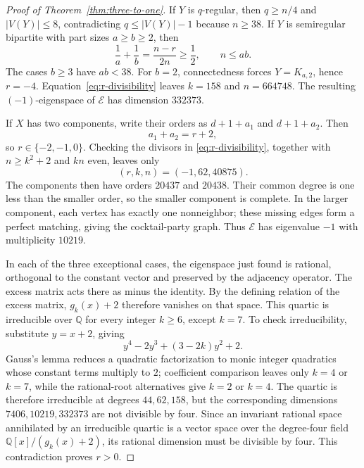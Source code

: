 \documentclass[a4paper,10pt,reqno]{amsart}
\theoremstyle{plain}
\theoremstyle{definition}
\theoremstyle{remark}
\begin{document}
\begin{proof}[Proof of Theorem~\ref{thm:three-to-one}]
If \(Y\) is \(q\)-regular, then \(q\ge n/4\) and
\(|V(Y)|\le8\), contradicting \(q\le |V(Y)|-1\) because \(n\ge38\).
If \(Y\) is semiregular bipartite with part sizes \(a\ge b\ge2\), then
\[
 \frac1a+\frac1b=\frac{n-r}{2n}\ge\frac12,\qquad n\le ab.
\]
The cases \(b\ge3\) have \(ab<38\).  For \(b=2\), connectedness forces
\(Y=K_{a,2}\), hence \(r=-4\).  Equation~\eqref{eq:r-divisibility} leaves
\(k=158\) and \(n=664748\).  The resulting \((-1)\)-eigenspace of \(\mathcal E\)
 has dimension \(332373\).

If \(X\) has two components, write their orders as
\(d+1+a_1\) and \(d+1+a_2\).  Then
\[
 a_1+a_2=r+2,
\]
so \(r\in\{-2,-1,0\}\).  Checking the divisors in
\eqref{eq:r-divisibility}, together with \(n\ge k^2+2\) and \(kn\) even,
leaves only
\[
 (r,k,n)=(-1,62,40875).
\]
The components then have orders \(20437\) and \(20438\).  Their common
degree is one less than the smaller order, so the smaller component is
complete.  In the larger component, each vertex has exactly one
nonneighbor; these missing edges form a perfect matching, giving the
cocktail-party graph.  Thus \(\mathcal E\) has eigenvalue \(-1\) with
 multiplicity \(10219\).

In each of the three exceptional cases, the eigenspace just found is
rational, orthogonal to the constant vector and preserved by the adjacency
operator. The excess matrix acts there as minus the identity. By the
defining relation of the excess matrix, \(g_k(x)+2\) therefore vanishes on
that space.  This quartic is irreducible over
\(\mathbb Q\) for every integer \(k\ge6\), except \(k=7\).  To check
irreducibility, substitute \(y=x+2\), giving
 \[
  y^4-2y^3+(3-2k)y^2+2.
 \]
 Gauss's lemma reduces a quadratic factorization to monic integer quadratics
 whose constant terms multiply to \(2\); coefficient comparison leaves only
 \(k=4\) or \(k=7\), while the rational-root alternatives give \(k=2\) or
 \(k=4\).  The quartic is therefore irreducible at degrees \(44,62,158\), but the
 corresponding dimensions \(7406,10219,332373\) are not divisible by four.
 Since an invariant rational space annihilated by an irreducible quartic is a
 vector space over the degree-four field \(\mathbb Q[x]/(g_k(x)+2)\), its
 rational dimension must be divisible by four.
 This contradiction proves \(r>0\).


\end{proof}
\end{document}

